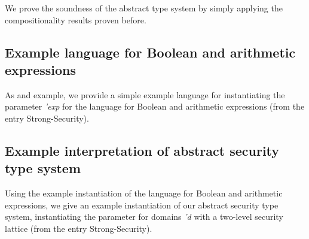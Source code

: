 \documentclass[11pt,a4paper]{article}
\begin{document}
We prove the soundness of the abstract type system by simply applying
the compositionality results proven before.



\subsection{Example language for Boolean and arithmetic expressions}

As and example, we provide a simple example language for instantiating the parameter
\textit{'exp} for the language for Boolean and arithmetic expressions
(from the entry Strong-Security).



\subsection{Example interpretation of abstract security type system}

Using the example instantiation of the language for Boolean and
arithmetic expressions, we give an example instantiation of our
abstract security type system, instantiating the parameter for domains
\textit{'d} with a two-level security lattice (from the entry Strong-Security).








\end{document}
